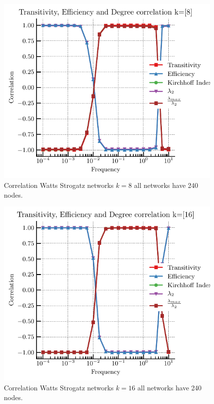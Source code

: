 \documentclass[fleqn,10pt]{wlscirep}
\begin{document}
\begin{figure}[H]
    \includegraphics[width=\linewidth]{fig/Transitiviry_Efficiency_DEgre_correlation_8.pdf} 
    \caption{Correlation Watts Strogatz networks $k=8$ all networks have 240 nodes.}
    \label{ws_correlation_8}
\end{figure}

\begin{figure}[H]
    \includegraphics[width=\linewidth]{fig/Transitiviry_Efficiency_DEgre_correlation_16.pdf} 
    \caption{Correlation Watts Strogatz networks $k=16$ all networks have 240 nodes.}
    \label{ws_correlation_16}
\end{figure}
\end{document}

